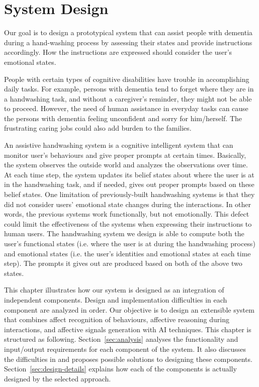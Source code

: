 \chapter{System Design}
\label{chap:design}

Our goal is to design a prototypical system that can assist people with dementia during a hand-washing process by assessing their states and provide instructions accordingly. How the instructions are expressed should consider the user's emotional states.

People with certain types of cognitive disabilities have trouble in accomplishing daily tasks. For example, persons with dementia tend to forget where they are in a handwashing task, and without a caregiver's reminder, they might not be able to proceed. However, the need of human assistance in everyday tasks can cause the persons with dementia feeling unconfident and sorry for him/herself. The frustrating caring jobs could also add burden to the families.

An assistive handwashing system is a cognitive intelligent system that can monitor user's behaviours and give proper prompts at certain times. Basically, the system observes the outside world and analyzes the observations over time. At each time step, the system updates its belief states about where the user is at in the handwashing task, and if needed, gives out proper prompts based on these belief states. One limitation of previously-built handwashing systems is that they did not consider users' emotional state changes during the interactions. In other words, the previous systems work functionally, but not emotionally. This defect could limit the effectiveness of the systems when expressing their instructions to human users. The handwashing system we design is able to compute both the user's functional states (i.e. where the user is at during the handwashing process) and emotional states (i.e. the user's identities and emotional states at each time step). The prompts it gives out are produced based on both of the above two states. 

This chapter illustrates how our system is designed as an integration of independent components. Design and implementation difficulties in each component are analyzed in order. Our objective is to design an extensible system that combines affect recognition of behaviours, affective reasoning during interactions, and affective signals generation with AI techniques. This chapter is structured as following. Section~\ref{sec:analysis} analyses the functionality and input/output requirements for each component of the system. It also discusses the difficulties in and proposes possible solutions to designing these components. Section~\ref{sec:design-details} explains how each of the components is actually designed by the selected approach.

